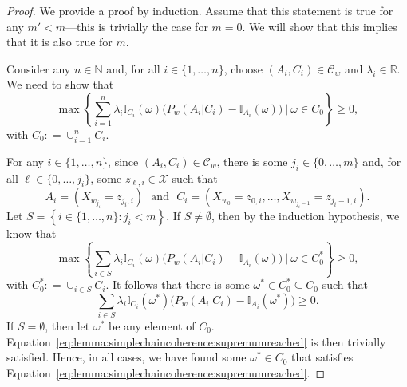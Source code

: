 \documentclass[10pt,a4paper]{paper}
\theoremstyle{definition}
\newcommand{\nats}{\mathbb{N}}
\newcommand{\reals}{\mathbb{R}}
\newcommand{\states}{\mathcal{X}}
\newcommand{\ind}[1]{\mathbb{I}_{#1}}
\newcommand{\coloneqq}{:\!=}
\begin{document}
\begin{proof}
We provide a proof by induction. Assume that this statement is true for any $m'<m$---this is trivially the case for $m=0$. We will show that this implies that it is also true for $m$.

Consider any $n\in\nats$ and, for all $i\in\{1,\dots,n\}$, choose $(A_i,C_i)\in\mathcal{C}_w$ and $\lambda_i\in\reals$. We need to show that
\begin{equation}\label{eq:lemma:simplechaincoherence:TB}
\max\left\{\sum_{i=1}^n\lambda_i\ind{C_i}(\omega)\bigl(P_w(A_i\vert C_i)-\ind{A_i}(\omega)\bigr)~\Bigg\vert~\omega\in C_0\right\}\geq0,
\end{equation}
with $C_0\coloneqq\cup_{i=1}^nC_i$. %

For any $i\in\{1,\dots,n\}$, since $(A_i,C_i)\in\mathcal{C}_w$, there is some $j_i\in\{0,\dots,m\}$ and, for all $\ell\in\{0,\dots,j_i\}$, some $z_{\ell,i}\in\states$ such that
\begin{equation*}
A_i=(X_{w_{j_i}}=z_{j_i,i})
\text{~~and~~}
C_i=(X_{w_{0}}=z_{0,i}, \dots, X_{w_{j_i-1}}=z_{j_i-1,i}).
\end{equation*}
Let $S=\left\{i\in\{1,\dots,n\}\colon j_i<m\right\}$. If $S\neq\emptyset$, then by the induction hypothesis, we know that
\begin{equation*}
\max\left\{\sum_{i\in S}\lambda_i\ind{C_i}(\omega)\bigl(P_w(A_i\vert C_i)-\ind{A_i}(\omega)\bigr)~\Bigg\vert~\omega\in C_0^*\right\}\geq0,
\end{equation*}
with $C_0^*\coloneqq\cup_{i\in S}C_i$. It follows that there is some $\omega^*\in C_0^*\subseteq C_0$ such that
\begin{equation}\label{eq:lemma:simplechaincoherence:supremumreached}
\sum_{i\in S}\lambda_i\ind{C_i}(\omega^*)\bigl(P_w(A_i\vert C_i)-\ind{A_i}(\omega^*)\bigr)\geq0.
\end{equation}
If $S=\emptyset$, then let $\omega^*$ be any element of $C_0$. Equation~\eqref{eq:lemma:simplechaincoherence:supremumreached} is then trivially satisfied. Hence, in all cases, we have found some $\omega^*\in C_0$ that satisfies Equation~\eqref{eq:lemma:simplechaincoherence:supremumreached}.



\end{proof}
\end{document}
